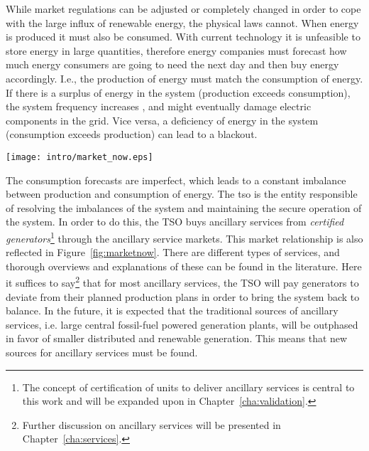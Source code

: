 While market regulations can be adjusted or completely changed in order to cope with the large influx of renewable energy, the physical laws cannot.
When energy is produced it must also be consumed. With current technology it is unfeasible to store energy in large quantities, therefore energy companies must forecast how much energy consumers are going to need the next day and then buy energy accordingly. I.e., the production of energy must match the consumption of energy. If there is a surplus of energy in the system (production exceeds consumption), the system frequency increases%
, and might eventually damage electric components in the grid. Vice versa, a deficiency of energy in the system (consumption exceeds production) can lead to a blackout. 
\begin{figure*}[htbp!]
		\centering
		\caption{The actors and relationships in the power market today. Note that the consumer buys electricity from a retailer, but has no further contact to the other market actors, i.e. the consumer has a passive role in the system.}\label{fig:marketnow}
	\texttt{[image: intro/market\_now.eps]}
\end{figure*}

The consumption forecasts are imperfect, which leads to a constant imbalance between production and consumption of energy. The \gls{tso} is the entity responsible of resolving the imbalances of the system and maintaining the secure operation of the system. In order to do this, the TSO buys ancillary services from \emph{certified generators}\footnote{The concept of certification of units to deliver ancillary services is central to this work and will be expanded upon in Chapter~\ref{cha:validation}.}  through the ancillary service markets. This market relationship is also reflected in Figure~\ref{fig:marketnow}. There are different types of services, and thorough overviews and explanations of these can be found in the literature. Here it suffices to say\footnote{Further discussion on ancillary services will be presented in Chapter~\ref{cha:services}.} that for most ancillary services, the TSO will pay generators to deviate from their planned production plans in order to bring the system back to balance. In the future, it is expected that the traditional sources of ancillary services, i.e. large central fossil-fuel powered generation plants, will be outphased in favor of smaller distributed and renewable generation. This means that new sources for ancillary services must be found.  
